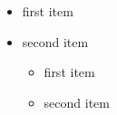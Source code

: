 \documentclass{beamer}
\begin{document}
\begin{frame}
\begin{itemize}
    \item first item
    \item second item
    \begin{itemize}
        \item first item
        \item second item
    \end{itemize}
\end{itemize}
\end{frame}
\end{document}
